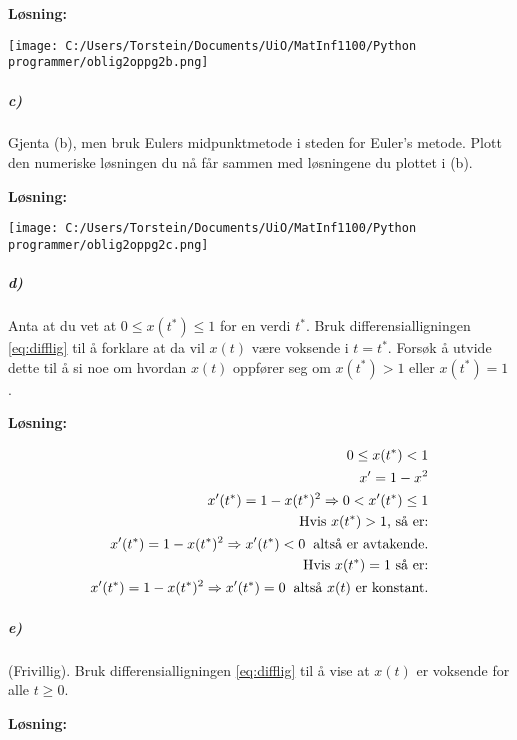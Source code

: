 \documentclass[11pt,norsk]{article}
\begin{document}
				\begin{flushleft}
\textbf{Løsning:}
				\end{flushleft}

\flushleft
\texttt{[image: C:/Users/Torstein/Documents/UiO/MatInf1100/Python programmer/oblig2oppg2b.png]}
			\subparagraph{c)}
				\begin{flushleft}
Gjenta (b), men bruk Eulers midpunktmetode i steden for Euler's metode. Plott den numeriske løsningen du nå får sammen med løsningene du plottet i (b).
				\end{flushleft}
				\begin{flushleft}
\textbf{Løsning:}
				\end{flushleft}

\flushleft
\texttt{[image: C:/Users/Torstein/Documents/UiO/MatInf1100/Python programmer/oblig2oppg2c.png]}
			\subparagraph{d)}
				\begin{flushleft}
Anta at du vet at $0 \le x(t^{*}) \le 1$ for en verdi $t^{*}$. Bruk differensialligningen \eqref{eq:difflig} til å forklare at da vil $x(t)$ være voksende i $t = t^{*}$. Forsøk å utvide dette til å si noe om hvordan $x(t)$ oppfører seg om $x(t^{*}) > 1$ eller $x(t^{*}) = 1$. 
				\end{flushleft}
				\begin{flushleft}
\textbf{Løsning:}
				\end{flushleft}
				\begin{align}
0 \le x(t^{*}) < 1 \\
x' = 1 - x^2 \\
x'(t^{*}) = 1 - x(t^{*})^2 \Rightarrow 0 < x'(t^{*}) \le 1 \\
\text{Hvis $x(t^{*}) > 1$, så er:} \\
x'(t^{*}) = 1 - x(t^{*})^2 \Rightarrow x'(t^{*}) < 0 \hspace{2mm} \text{altså er avtakende.} \nonumber \\
\text{Hvis $x(t^{*}) = 1$ så er:} \\
x'(t^{*}) = 1 - x(t^{*})^2 \Rightarrow x'(t^{*}) = 0 \hspace{2mm} \text{altså $x(t)$ er konstant.} \nonumber
				\end{align}
			\subparagraph{e)}
				\begin{flushleft}
(Frivillig). Bruk differensialligningen \eqref{eq:difflig} til å vise at $x(t)$ er voksende for alle $t \ge 0$.
				\end{flushleft}
				\begin{flushleft}
\textbf{Løsning:}
				\end{flushleft}
\end{document}
